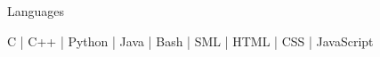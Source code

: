 

\begin{cventries}

  \cventry
    {} %
    {Languages} %
    {}%
    {} %
    {
      \begin{cvitems} %
        \item { C | C++ | Python | Java | Bash | SML | HTML | CSS | JavaScript}
      \end{cvitems}
    }

\end{cventries}

